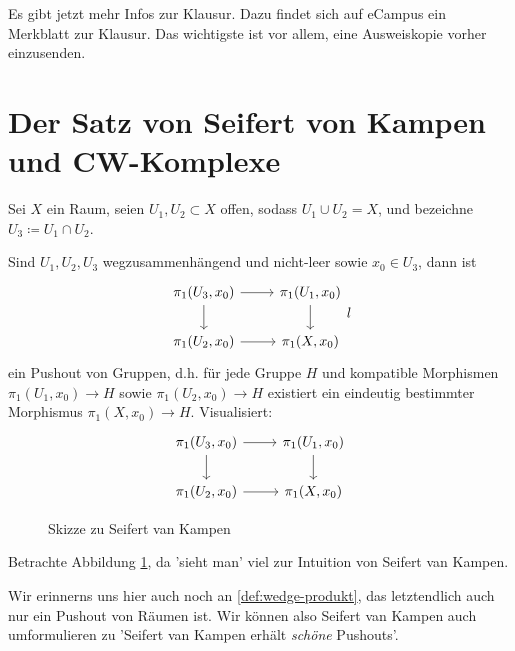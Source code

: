 
\begin{orga}
    Es gibt jetzt mehr Infos zur Klausur. Dazu findet sich auf eCampus ein Merkblatt zur Klausur. Das wichtigste ist vor allem, eine Ausweiskopie vorher einzusenden.
\end{orga}

\section{Der Satz von Seifert von Kampen und CW-Komplexe}

\begin{theorem}\label{thm:seifert-van-kampen}
    Sei $X$ ein Raum, seien  $U_1,U_2\subset X$ offen, sodass $U_1\cup U_2 = X$, und bezeichne  $U_3 \coloneqq  U_1 \cap U_2$.

    Sind $U_1,U_2,U_3$ wegzusammenhängend und nicht-leer sowie $x_0\in U_3$, dann ist
    \[
    \begin{tikzcd}
        \pi_1(U_3,x_0) \ar[swap]{d}{} \ar{r}{} & \pi_1(U_1,x_0) \ar{d}{} \\
        \pi_1(U_2,x_0) \ar[swap]{r}{} & \pi_1(X,x_0)
    \end{tikzcd}
    l\]
    ein Pushout von Gruppen, d.h. für jede Gruppe $H$ und kompatible Morphismen  $\pi_1(U_1,x_0) \to  H$ sowie $\pi_1(U_2,x_0) \to  H$ existiert ein eindeutig bestimmter Morphismus $\pi_1(X,x_0) \to  H$. Visualisiert:
    \[
    \begin{tikzcd}
        \pi_1(U_3,x_0) \ar[swap]{d}{} \ar{r}{} & \pi_1(U_1,x_0) \ar{d}{} \\
        \pi_1(U_2,x_0) \ar[swap]{r}{} & \pi_1(X,x_0)
    \end{tikzcd}
    \]
\end{theorem}

\begin{figure}[ht]
    \centering
    \caption{Skizze zu Seifert van Kampen}
    \label{fig:skizze-zu-seifert-van-kampen}
\end{figure}

Betrachte Abbildung \ref{fig:skizze-zu-seifert-van-kampen}, da 'sieht man' viel zur Intuition von Seifert van Kampen.


Wir erinnerns uns hier auch noch an \autoref{def:wedge-produkt}, das letztendlich auch nur ein Pushout von Räumen ist. Wir können also Seifert van Kampen auch umformulieren zu 'Seifert van Kampen erhält \textit{schöne} Pushouts'.


